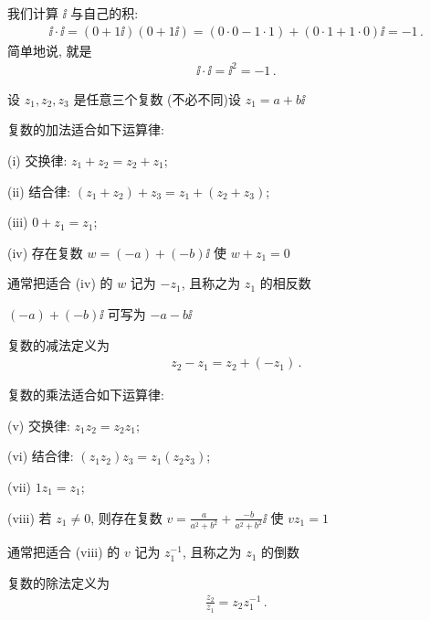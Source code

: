 \begin{example}
    我们计算 $\ii$ 与自己的积:
    \begin{align*}
        \ii \cdot \ii = (0 + 1\ii) (0 + 1\ii) = (0 \cdot 0 - 1 \cdot 1) + (0 \cdot 1 + 1 \cdot 0) \ii = -1 \period
    \end{align*}
    简单地说, 就是
    \begin{align*}
        \ii \cdot \ii = \ii^2 = -1 \period
    \end{align*}
\end{example}

设 $z_1, z_2, z_3$ 是任意三个复数 (不必不同)\period 设 $z_1 = a + b \ii$\period

\begin{proposition}
    复数的加法适合如下运算律:

    (i) 交换律: $z_1 + z_2 = z_2 + z_1$;

    (ii) 结合律: $(z_1 + z_2) + z_3 = z_1 + (z_2 + z_3)$;

    (iii) $0 + z_1 = z_1$;

    (iv) 存在复数 $w = (-a) + (-b) \ii$ 使 $w + z_1 = 0$\period

    通常把适合 (iv) 的 $w$ 记为 $-z_1$, 且称之为 $z_1$ 的相反数\period
\end{proposition}

\begin{remark}
    $(-a) + (-b) \ii$ 可写为 $-a-b \ii$\period
\end{remark}

\begin{definition}
    复数的减法定义为
    \begin{align*}
        z_2 - z_1 = z_2 + (-z_1) \period
    \end{align*}
\end{definition}

\begin{proposition}
    复数的乘法适合如下运算律:

    (v) 交换律: $z_1 z_2 = z_2 z_1$;

    (vi) 结合律: $(z_1 z_2) z_3 = z_1 (z_2 z_3)$;

    (vii) $1 z_1 = z_1$;

    (viii) 若 $z_1 \neq 0$, 则存在复数 $v = \frac{a}{a^2 + b^2} + \frac{-b}{a^2 + b^2} \ii$ 使 $v z_1 = 1$\period

    通常把适合 (viii) 的 $v$ 记为 $z_1^{-1}$, 且称之为 $z_1$ 的倒数\period
\end{proposition}

\begin{definition}
    复数的除法定义为
    \begin{align*}
        \frac{z_2}{z_1} = z_2 z_1^{-1} \period
    \end{align*}
\end{definition}

